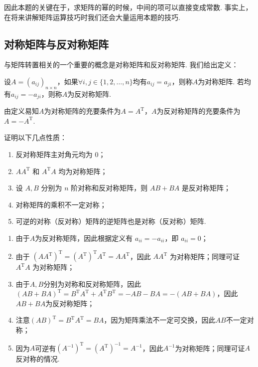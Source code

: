 因此本题的关键在于，求矩阵的幂的时候，中间的项可以直接变成常数. 事实上，在将来讲解矩阵运算技巧时我们还会大量运用本题的技巧.

\subsection{对称矩阵与反对称矩阵}

与矩阵转置相关的一个重要的概念是对称矩阵和反对称矩阵. 我们给出定义：
\begin{definition}{}{}
    设$A=(a_{ij})_{n \times n}$，如果$\forall i,j\in\{1,2,\ldots,n\}$均有$a_{ij}=a_{ji}$，则称$A$为对称矩阵. 若均有$a_{ij}=-a_{ji}$，则称$A$为反对称矩阵.
\end{definition}
由定义易知$A$为对称矩阵的充要条件为$A=A^\mathrm{T}$，$A$为反对称矩阵的充要条件为$A=-A^\mathrm{T}$.
\begin{example}{}{}
    证明以下几点性质：
    \begin{enumerate}
        \item 反对称矩阵主对角元均为 $0$；

        \item $AA^\mathrm{T}$ 和 $A^\mathrm{T}A$ 均为对称矩阵；

        \item 设 $A, B$ 分别为 $n$ 阶对称和反对称矩阵，则 $AB + BA$ 是反对称矩阵；

        \item 对称矩阵的乘积不一定对称；

        \item 可逆的对称（反对称）矩阵的逆矩阵也是对称（反对称）矩阵.
    \end{enumerate}
\end{example}

\begin{solution}
    \begin{enumerate}
        \item 由于$A$为反对称矩阵，因此根据定义有 $a_{ii} = -a_{ii}$，即 $a_{ii} = 0$；

        \item 由于 $(AA^\mathrm{T})^\mathrm{T} = (A^\mathrm{T})^\mathrm{T}A^\mathrm{T} = AA^\mathrm{T}$，因此 $AA^\mathrm{T}$ 为对称矩阵；同理可证 $A^\mathrm{T}A$ 为对称矩阵；

        \item 由于$A,B$分别为对称和反对称矩阵，因此$(AB+BA)^\mathrm{T}=B^\mathrm{T}A^\mathrm{T}+A^\mathrm{T}B^\mathrm{T}=-AB-BA=-(AB+BA)$，因此$AB+BA$为反对称矩阵；

        \item 注意$(AB)^\mathrm{T}=B^\mathrm{T}A^\mathrm{T}=BA$，因为矩阵乘法不一定可交换，因此$AB$不一定对称；

        \item 因为$A$可逆有$(A^{-1})^\mathrm{T}=(A^\mathrm{T})^{-1}=A^{-1}$，因此$A^{-1}$为对称矩阵；同理可证$A$反对称的情况.
    \end{enumerate}
\end{solution}


